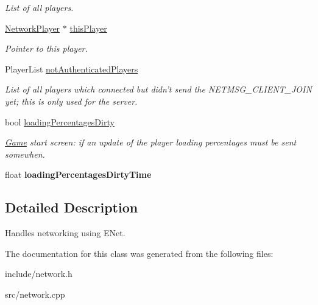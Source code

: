 \begin{DoxyCompactItemize}
\begin{DoxyCompactList}\small\item\em \-List of all players. \end{DoxyCompactList}\item 
\hypertarget{classNetwork_adb566caccece918c1c256e7caf5d21a5}{
\hyperlink{structNetworkPlayer}{\-Network\-Player} $\ast$ \hyperlink{classNetwork_adb566caccece918c1c256e7caf5d21a5}{this\-Player}}
\label{d5/d16/classNetwork_adb566caccece918c1c256e7caf5d21a5}

\begin{DoxyCompactList}\small\item\em \-Pointer to this player. \end{DoxyCompactList}\item 
\hypertarget{classNetwork_ae738fed0856ac70d5a23549636eace8a}{
\-Player\-List \hyperlink{classNetwork_ae738fed0856ac70d5a23549636eace8a}{not\-Authenticated\-Players}}
\label{d5/d16/classNetwork_ae738fed0856ac70d5a23549636eace8a}

\begin{DoxyCompactList}\small\item\em \-List of all players which connected but didn't send the \-N\-E\-T\-M\-S\-G\-\_\-\-C\-L\-I\-E\-N\-T\-\_\-\-J\-O\-I\-N yet; this is only used for the server. \end{DoxyCompactList}\item 
\hypertarget{classNetwork_a5fd7f9344b0ce8c791ce59301dab6193}{
bool \hyperlink{classNetwork_a5fd7f9344b0ce8c791ce59301dab6193}{loading\-Percentages\-Dirty}}
\label{d5/d16/classNetwork_a5fd7f9344b0ce8c791ce59301dab6193}

\begin{DoxyCompactList}\small\item\em \hyperlink{classGame}{\-Game} start screen\-: if an update of the player loading percentages must be sent somewhen. \end{DoxyCompactList}\item 
\hypertarget{classNetwork_ab7424e2bd94a50c2916a1e7cd004a1b6}{
float {\bfseries loading\-Percentages\-Dirty\-Time}}
\label{d5/d16/classNetwork_ab7424e2bd94a50c2916a1e7cd004a1b6}

\end{DoxyCompactItemize}


\subsection{\-Detailed \-Description}
\-Handles networking using \-E\-Net. 

\-The documentation for this class was generated from the following files\-:\begin{DoxyCompactItemize}
\item 
include/network.\-h\item 
src/network.\-cpp\end{DoxyCompactItemize}
